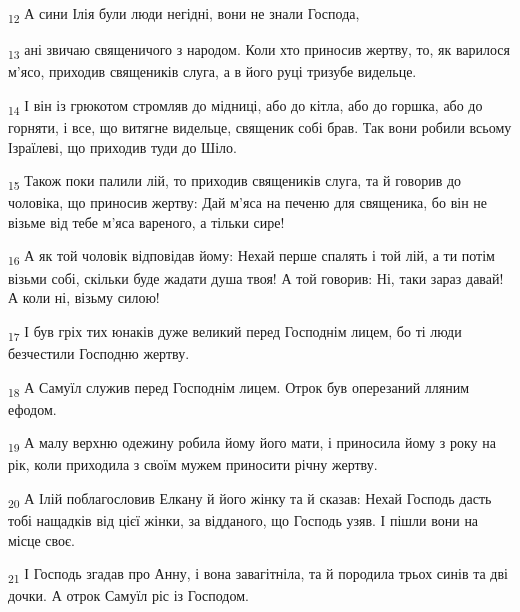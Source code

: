 \begin{tcolorbox}
\textsubscript{12} А сини Ілія були люди негідні, вони не знали Господа,
\end{tcolorbox}
\begin{tcolorbox}
\textsubscript{13} ані звичаю священичого з народом. Коли хто приносив жертву, то, як варилося м'ясо, приходив священиків слуга, а в його руці тризубе видельце.
\end{tcolorbox}
\begin{tcolorbox}
\textsubscript{14} І він із грюкотом стромляв до мідниці, або до кітла, або до горшка, або до горняти, і все, що витягне видельце, священик собі брав. Так вони робили всьому Ізраїлеві, що приходив туди до Шіло.
\end{tcolorbox}
\begin{tcolorbox}
\textsubscript{15} Також поки палили лій, то приходив священиків слуга, та й говорив до чоловіка, що приносив жертву: Дай м'яса на печеню для священика, бо він не візьме від тебе м'яса вареного, а тільки сире!
\end{tcolorbox}
\begin{tcolorbox}
\textsubscript{16} А як той чоловік відповідав йому: Нехай перше спалять і той лій, а ти потім візьми собі, скільки буде жадати душа твоя! А той говорив: Ні, таки зараз давай! А коли ні, візьму силою!
\end{tcolorbox}
\begin{tcolorbox}
\textsubscript{17} І був гріх тих юнаків дуже великий перед Господнім лицем, бо ті люди безчестили Господню жертву.
\end{tcolorbox}
\begin{tcolorbox}
\textsubscript{18} А Самуїл служив перед Господнім лицем. Отрок був оперезаний лляним ефодом.
\end{tcolorbox}
\begin{tcolorbox}
\textsubscript{19} А малу верхню одежину робила йому його мати, і приносила йому з року на рік, коли приходила з своїм мужем приносити річну жертву.
\end{tcolorbox}
\begin{tcolorbox}
\textsubscript{20} А Ілій поблагословив Елкану й його жінку та й сказав: Нехай Господь дасть тобі нащадків від цієї жінки, за відданого, що Господь узяв. І пішли вони на місце своє.
\end{tcolorbox}
\begin{tcolorbox}
\textsubscript{21} І Господь згадав про Анну, і вона завагітніла, та й породила трьох синів та дві дочки. А отрок Самуїл ріс із Господом.
\end{tcolorbox}
